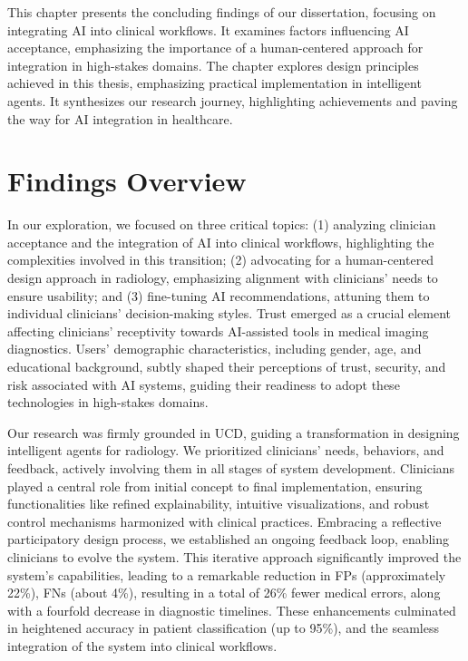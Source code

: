 \clearpage
\label{chap:chap008}

This chapter presents the concluding findings of our dissertation, focusing on integrating \ac{AI} into clinical workflows.
It examines factors influencing \ac{AI} acceptance, emphasizing the importance of a human-centered approach for integration in high-stakes domains.
The chapter explores design principles achieved in this thesis, emphasizing practical implementation in intelligent agents.
It synthesizes our research journey, highlighting achievements and paving the way for \ac{AI} integration in healthcare.

\section{Findings Overview}
\label{sec:chap008001}

\textcolor{revised}{In our exploration, we focused on three critical topics:
(1) analyzing clinician acceptance and the integration of \ac{AI} into clinical workflows, highlighting the complexities involved in this transition;
(2) advocating for a human-centered design approach in radiology, emphasizing alignment with clinicians' needs to ensure usability; and
(3) fine-tuning \ac{AI} recommendations, attuning them to individual clinicians' decision-making styles.
Trust emerged as a crucial element affecting clinicians' receptivity towards \ac{AI}-assisted tools in medical imaging diagnostics.
Users' demographic characteristics, including gender, age, and educational background, subtly shaped their perceptions of trust, security, and risk associated with \ac{AI} systems, guiding their readiness to adopt these technologies in high-stakes domains.}

\textcolor{revised}{Our research was firmly grounded in \acs{UCD}, guiding a transformation in designing intelligent agents for radiology.
We prioritized clinicians' needs, behaviors, and feedback, actively involving them in all stages of system development.
Clinicians played a central role from initial concept to final implementation, ensuring functionalities like refined explainability, intuitive visualizations, and robust control mechanisms harmonized with clinical practices.
Embracing a reflective participatory design process, we established an ongoing feedback loop, enabling clinicians to evolve the system.
This iterative approach significantly improved the system's capabilities, leading to a remarkable reduction in \acp{FP} (approximately 22\%), \acp{FN} (about 4\%), resulting in a total of 26\% fewer medical errors, along with a fourfold decrease in diagnostic timelines.
These enhancements culminated in heightened accuracy in patient classification (up to 95\%), and the seamless integration of the system into clinical workflows.}

